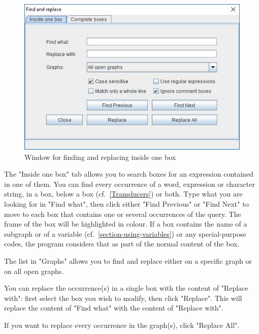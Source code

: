 \noindent 
\begin{figure}[!ht]
\begin{center}
\includegraphics[width=13.6cm]{resources/img/findandreplace-one-box.jpg}
\caption{Window for finding and replacing inside one box\label{find-in-one-box}}
\end{center}
\end{figure}

\noindent The "Inside one box" tab allows you to search boxes for an expression
contained in one of them. You can find every occurrence of a word, expression or
character string, in a box, below a box (cf.~\ref{Transducers}) or both. Type what
you are looking for in "Find what", then click either "Find Previous" or "Find Next"
to move to each box that contains one or several occurrences of the query.
The frame of the box will be highlighted in colour. If a box contains the name of a
subgraph or of a variable (cf.~\ref{section-using-variables}) or any special-purpose
codes, the program considers that as part of the normal content of the box.

\bigskip
\noindent The list in "Graphs" allows you to find and replace either on a specific graph
or on all open graphs.

\bigskip
\noindent You can replace the occurrence(s) in a single box with the content of
"Replace with": first select the box you wish to modify, then click "Replace".
This will replace the content of "Find what" with the content of "Replace with".

\bigskip
\noindent If you want to replace every occurrence in the graph(s), click "Replace
All".


